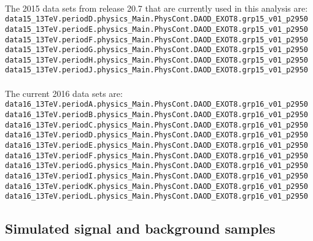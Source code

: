 \paragraph{}
The 2015 data sets from release 20.7 that are currently used in this analysis are:
\noindent
\\
{\scriptsize
\verb|data15_13TeV.periodD.physics_Main.PhysCont.DAOD_EXOT8.grp15_v01_p2950|\\
\verb|data15_13TeV.periodE.physics_Main.PhysCont.DAOD_EXOT8.grp15_v01_p2950|\\
\verb|data15_13TeV.periodF.physics_Main.PhysCont.DAOD_EXOT8.grp15_v01_p2950|\\
\verb|data15_13TeV.periodG.physics_Main.PhysCont.DAOD_EXOT8.grp15_v01_p2950|\\
\verb|data15_13TeV.periodH.physics_Main.PhysCont.DAOD_EXOT8.grp15_v01_p2950|\\
\verb|data15_13TeV.periodJ.physics_Main.PhysCont.DAOD_EXOT8.grp15_v01_p2950|
}

\paragraph{}
The current 2016 data sets are:
\noindent
\\
{\scriptsize
\verb|data16_13TeV.periodA.physics_Main.PhysCont.DAOD_EXOT8.grp16_v01_p2950|\\
\verb|data16_13TeV.periodB.physics_Main.PhysCont.DAOD_EXOT8.grp16_v01_p2950|\\
\verb|data16_13TeV.periodC.physics_Main.PhysCont.DAOD_EXOT8.grp16_v01_p2950|\\
\verb|data16_13TeV.periodD.physics_Main.PhysCont.DAOD_EXOT8.grp16_v01_p2950|\\
\verb|data16_13TeV.periodE.physics_Main.PhysCont.DAOD_EXOT8.grp16_v01_p2950|\\
\verb|data16_13TeV.periodF.physics_Main.PhysCont.DAOD_EXOT8.grp16_v01_p2950|\\
\verb|data16_13TeV.periodG.physics_Main.PhysCont.DAOD_EXOT8.grp16_v01_p2950|\\
\verb|data16_13TeV.periodI.physics_Main.PhysCont.DAOD_EXOT8.grp16_v01_p2950|\\
\verb|data16_13TeV.periodK.physics_Main.PhysCont.DAOD_EXOT8.grp16_v01_p2950|\\
\verb|data16_13TeV.periodL.physics_Main.PhysCont.DAOD_EXOT8.grp16_v01_p2950|
}


\clearpage
\subsection{Simulated signal and background samples}
